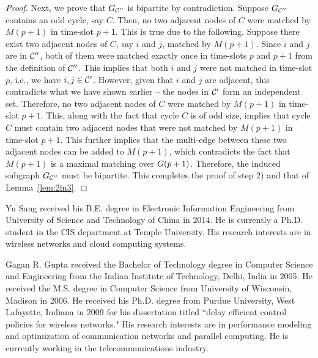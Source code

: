 \documentclass[10pt,journal,compsoc]{IEEEtran}
\begin{document}
\begin{proof}
Next, we prove that $G_{\mathcal{C}^{\prime \prime}}$ is bipartite by contradiction. Suppose 
$G_{\mathcal{C}^{\prime \prime}}$ contains an odd cycle, say $C$. Then, no two adjacent 
nodes of $C$ were matched by $M(p+1)$ in time-slot $p+1$. This is true due to the following. 
Suppose there exist two adjacent nodes of $C$, say $i$ and $j$, matched by $M(p+1)$. 
Since $i$ and $j$ are in $\mathcal{C}^{\prime \prime}$, both of them were matched exactly once in 
time-slots $p$ and $p+1$ from the definition of $\mathcal{C}^{\prime \prime}$. This implies that both 
$i$ and $j$ were not matched in time-slot $p$, i.e., we have $i,j \in \mathcal{C}^{\prime}$. However,
given that $i$ and $j$ are adjacent, this contradicts what we have shown earlier -- the nodes 
in $\mathcal{C}^{\prime}$ form an independent set. Therefore, no two adjacent nodes of $C$ were 
matched by $M(p+1)$ in time-slot $p+1$. This, along with the fact that cycle $C$ is of odd size, 
implies that cycle $C$ must contain two adjacent nodes that were not matched by $M(p+1)$ 
in time-slot $p+1$. This further implies that the multi-edge between these two adjacent nodes 
can be added to $M(p+1)$, which contradicts the fact that $M(p+1)$ is a maximal matching 
over $G(p+1)$. Therefore, the induced subgraph $G_{\mathcal{C}^{\prime \prime}}$ must 
be bipartite. This completes the proof of step 2) and that of Lemma~\ref{lem:2in3}.
\end{proof}

















\begin{IEEEbiography}{Yu Sang}
received his B.E. degree in Electronic Information Engineering from
University of Science and Technology of China in 2014. He is currently
a Ph.D. student in the CIS department at Temple University. His research
interests are in wireless networks and cloud computing systems.
\end{IEEEbiography}

\begin{IEEEbiography}{Gagan R. Gupta}
received the Bachelor of Technology degree in Computer Science and 
Engineering from the Indian Institute of Technology, Delhi, India in 
2005. He received the M.S. degree in Computer Science from University 
of Wisconsin, Madison in 2006. He received his Ph.D. degree from Purdue 
University, West Lafayette, Indiana in 2009 for his dissertation titled 
``delay efficient control policies for wireless networks." His research 
interests are in performance modeling and optimization of communication 
networks and parallel computing. He is currently working in the telecommunications 
industry.
\end{IEEEbiography}
\end{document}
